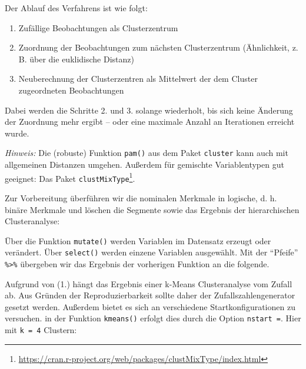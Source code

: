 \documentclass[12pt,ngerman,]{book}
\makeatletter
\newenvironment{Shaded}{\begin{snugshade}}{\end{snugshade}}
\newcommand{\KeywordTok}[1]{\textcolor[rgb]{0.13,0.29,0.53}{\textbf{{#1}}}}
\newcommand{\DataTypeTok}[1]{\textcolor[rgb]{0.13,0.29,0.53}{{#1}}}
\newcommand{\StringTok}[1]{\textcolor[rgb]{0.31,0.60,0.02}{{#1}}}
\newcommand{\NormalTok}[1]{{#1}}
\providecommand{\tightlist}{%
  \setlength{\itemsep}{0pt}\setlength{\parskip}{0pt}}
\let\rmarkdownfootnote\footnote%
\def\footnote{\protect\rmarkdownfootnote}
\renewcommand{\href}[2]{#2\footnote{\url{#1}}}
\newenvironment{kframe}{%
\medskip{}
\setlength{\fboxsep}{.8em}
 \def\at@end@of@kframe{}%
 \ifinner\ifhmode%
  \def\at@end@of@kframe{\end{minipage}}%
  \begin{minipage}{\columnwidth}%
 \fi\fi%
 \def\FrameCommand##1{\hskip\@totalleftmargin \hskip-\fboxsep
 \colorbox{shadecolor}{##1}\hskip-\fboxsep
     \hskip-\linewidth \hskip-\@totalleftmargin \hskip\columnwidth}%
 \MakeFramed {\advance\hsize-\width
   \@totalleftmargin\z@ \linewidth\hsize
   \@setminipage}}%
 {\par\unskip\endMakeFramed%
 \at@end@of@kframe}
\renewenvironment{Shaded}{\begin{kframe}}{\end{kframe}}
\theoremstyle{definition}
\theoremstyle{definition}
\theoremstyle{remark}
\makeatother
\begin{document}
Der Ablauf des Verfahrens ist wie folgt:

\begin{enumerate}
\def\labelenumi{\arabic{enumi}.}
\tightlist
\item
  Zufällige Beobachtungen als Clusterzentrum
\item
  Zuordnung der Beobachtungen zum nächsten Clusterzentrum (Ähnlichkeit,
  z. B. über die euklidische Distanz)
\item
  Neuberechnung der Clusterzentren als Mittelwert der dem Cluster
  zugeordneten Beobachtungen
\end{enumerate}

Dabei werden die Schritte 2. und 3. solange wiederholt, bis sich keine
Änderung der Zuordnung mehr ergibt -- oder eine maximale Anzahl an
Iterationen erreicht wurde.

\emph{Hinweis:} Die (robuste) Funktion \texttt{pam()} aus dem Paket
\texttt{cluster} kann auch mit allgemeinen Distanzen umgehen. Außerdem
für gemischte Variablentypen gut geeignet: Das Paket
\href{https://cran.r-project.org/web/packages/clustMixType/index.html}{\texttt{clustMixType}}.

Zur Vorbereitung überführen wir die nominalen Merkmale in logische, d.
h. binäre Merkmale und löschen die Segmente sowie das Ergebnis der
hierarchischen Clusteranalyse:

\begin{Shaded}
\end{Shaded}

Über die Funktion \texttt{mutate()} werden Variablen im Datensatz
erzeugt oder verändert. Über \texttt{select()} werden einzene Variablen
ausgewählt. Mit der ``Pfeife'' \texttt{\%\textgreater{}\%} übergeben wir
das Ergebnis der vorherigen Funktion an die folgende.

Aufgrund von (1.) hängt das Ergebnis einer k-Means Clusteranalyse vom
Zufall ab. Aus Gründen der Reproduzierbarkeit sollte daher der
Zufallszahlengenerator gesetzt werden. Außerdem bietet es sich an
verschiedene Startkonfigurationen zu versuchen. in der Funktion
\texttt{kmeans()} erfolgt dies durch die Option \texttt{nstart\ =}. Hier
mit \texttt{k\ =\ 4} Clustern:
\end{document}
